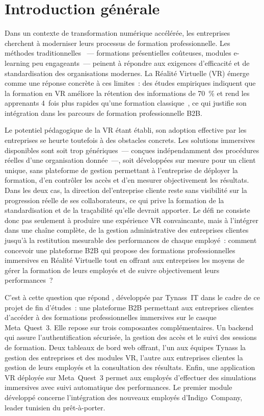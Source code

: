 \chapter*{Introduction générale}

Dans un contexte de transformation numérique accélérée, les entreprises cherchent à
moderniser leurs processus de formation professionnelle. Les méthodes traditionnelles
~--- formations présentielles coûteuses, modules e-learning peu engageants~--- peinent à
répondre aux exigences d'efficacité et de standardisation des organisations modernes.
La Réalité Virtuelle (VR) émerge comme une réponse concrète à ces limites~: des études
empiriques indiquent que la formation en VR améliore la rétention des informations de
70~\% et rend les apprenants 4~fois plus rapides qu'une formation classique~\cite{pwc2020},
ce qui justifie son intégration dans les parcours de formation professionnelle B2B.

Le potentiel pédagogique de la VR étant établi, son adoption effective par les entreprises
se heurte toutefois à des obstacles concrets. Les solutions immersives disponibles sont
soit trop génériques~--- conçues indépendamment des procédures réelles d'une organisation
donnée~---, soit développées sur mesure pour un client unique, sans plateforme de gestion
permettant à l'entreprise de déployer la formation, d'en contrôler les accès et d'en
mesurer objectivement les résultats. Dans les deux cas, la direction del'entreprise cliente reste sans
visibilité sur la progression réelle de ses collaborateurs, ce qui prive la formation de
la standardisation et de la traçabilité qu'elle devrait apporter. Le défi ne consiste
donc pas seulement à produire une expérience VR convaincante, mais à l'intégrer dans une
chaîne complète, de la gestion administrative des entreprises clientes jusqu'à la
restitution mesurable des performances de chaque employé~: comment concevoir une plateforme
B2B qui propose des formations professionnelles immersives en Réalité Virtuelle tout en
offrant aux entreprises les moyens de gérer la formation de leurs employés et de suivre objectivement leurs
performances~?

C'est à cette question que répond \tynassit{}, développée par Tynass~IT dans le cadre de
ce projet de fin d'études~: une plateforme B2B permettant aux entreprises clientes d'accéder
à des formations professionnelles immersives sur le casque Meta~Quest~3. Elle repose sur
trois composantes complémentaires. Un backend qui assure 
l'authentification sécurisée, la gestion des accès et le suivi des sessions de formation.
Deux tableaux de bord web offrant, l'un aux équipes Tynass la gestion
des entreprises et des modules VR, l'autre aux entreprises clientes la gestion de leurs
employés et la consultation des résultats. Enfin, une application VR déployée sur
Meta~Quest~3 permet aux employés d'effectuer des simulations immersives avec suivi
automatique des performances. Le premier module développé concerne l'intégration des
nouveaux employés d'Indigo~Company, leader tunisien du prêt-à-porter.

